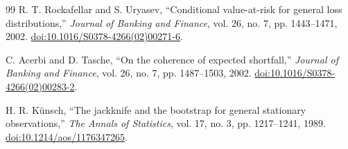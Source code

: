 \documentclass[11pt,a4paper]{article}
\begin{document}
\begin{thebibliography}{99}
R. T. Rockafellar and S. Uryasev,
``Conditional value-at-risk for general loss distributions,''
\emph{Journal of Banking and Finance}, vol. 26, no. 7, pp. 1443--1471, 2002.
\href{https://doi.org/10.1016/S0378-4266(02)00271-6}{doi:10.1016/S0378-4266(02)00271-6}.

C. Acerbi and D. Tasche,
``On the coherence of expected shortfall,''
\emph{Journal of Banking and Finance}, vol. 26, no. 7, pp. 1487--1503, 2002.
\href{https://doi.org/10.1016/S0378-4266(02)00283-2}{doi:10.1016/S0378-4266(02)00283-2}.

H. R. K\"unsch,
``The jackknife and the bootstrap for general stationary observations,''
\emph{The Annals of Statistics}, vol. 17, no. 3, pp. 1217--1241, 1989.
\href{https://doi.org/10.1214/aos/1176347265}{doi:10.1214/aos/1176347265}.

\end{thebibliography}
\end{document}
